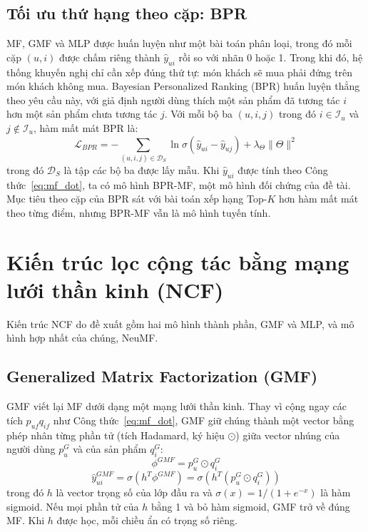 \subsection{Tối ưu thứ hạng theo cặp: BPR}
\label{subsec:bpr}

MF, GMF và MLP được huấn luyện như một bài toán phân loại, trong đó mỗi cặp $(u, i)$ được chấm riêng thành $\hat{y}_{ui}$ rồi so với nhãn 0 hoặc 1. Trong khi đó, hệ thống khuyến nghị chỉ cần xếp đúng thứ tự: món khách sẽ mua phải đứng trên món khách không mua. Bayesian Personalized Ranking (BPR) \parencite{rendle2009bpr} huấn luyện thẳng theo yêu cầu này, với giả định người dùng thích một sản phẩm đã tương tác $i$ hơn một sản phẩm chưa tương tác $j$. Với mỗi bộ ba $(u, i, j)$ trong đó $i \in \mathcal{I}_u$ và $j \notin \mathcal{I}_u$, hàm mất mát BPR là:
\begin{equation}
    \mathcal{L}_{BPR} = -\sum_{(u,i,j) \in \mathcal{D}_S} \ln \sigma\left(\hat{y}_{ui} - \hat{y}_{uj}\right) + \lambda_\Theta \lVert \Theta \rVert^2
    \label{eq:bpr_loss}
\end{equation}
trong đó $\mathcal{D}_S$ là tập các bộ ba được lấy mẫu. Khi $\hat{y}_{ui}$ được tính theo Công thức~\eqref{eq:mf_dot}, ta có mô hình BPR-MF, một mô hình đối chứng của đề tài. Mục tiêu theo cặp của BPR sát với bài toán xếp hạng Top-$K$ hơn hàm mất mát theo từng điểm, nhưng BPR-MF vẫn là mô hình tuyến tính.

\section{Kiến trúc lọc cộng tác bằng mạng lưới thần kinh (NCF)}
\label{sec:ncf_architecture}

Kiến trúc NCF do \textcite{he2017ncf} đề xuất gồm hai mô hình thành phần, GMF và MLP, và mô hình hợp nhất của chúng, NeuMF.

\subsection{Generalized Matrix Factorization (GMF)}
\label{subsec:gmf}

GMF viết lại MF dưới dạng một mạng lưới thần kinh. Thay vì cộng ngay các tích $p_{uf} q_{if}$ như Công thức~\eqref{eq:mf_dot}, GMF giữ chúng thành một vector bằng phép nhân từng phần tử (tích Hadamard, ký hiệu $\odot$) giữa vector nhúng của người dùng $p_u^G$ và của sản phẩm $q_i^G$:
\begin{equation}
    \phi^{GMF} = p_u^G \odot q_i^G
    \label{eq:gmf_hadamard}
\end{equation}
\begin{equation}
    \hat{y}_{ui}^{GMF} = \sigma \left( h^T \phi^{GMF} \right) = \sigma \left( h^T (p_u^G \odot q_i^G) \right)
    \label{eq:gmf_predict}
\end{equation}
trong đó $h$ là vector trọng số của lớp đầu ra và $\sigma(x) = 1 / (1 + e^{-x})$ là hàm sigmoid. Nếu mọi phần tử của $h$ bằng 1 và bỏ hàm sigmoid, GMF trở về đúng MF. Khi $h$ được học, mỗi chiều ẩn có trọng số riêng.


